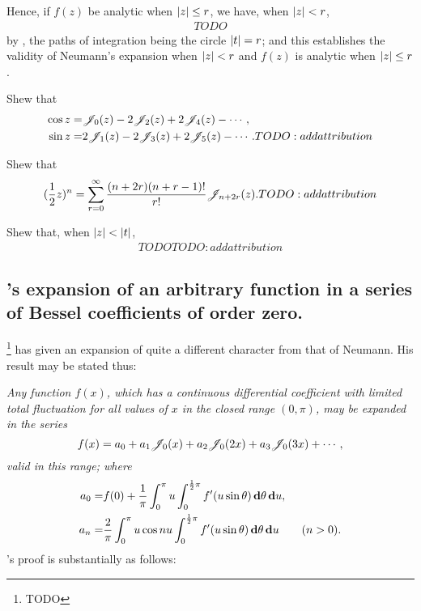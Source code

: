 \documentclass{book}
\begin{document}
Hence, if $f(z)$ be analytic when $\left| z \right| \leq r$, we have, when
$\left| z \right| < r$,
\begin{align*}
  TODO
\end{align*}
by , the paths of integration being the circle
$\left| t \right|=r$; and this establishes the validity of Neumann's
expansion when $\left| z \right| < r$ and $f(z)$ is analytic when
$\left| z \right|\leq r$.

% 
%
\begin{wandwexample}
  Shew that
  \begin{align*}
    \cos z =& \mathscr{J}_0(z) - 2\mathscr{J}_2(z) + 2\mathscr{J}_4(z) - \cdots, \\
    \sin z =& 2\mathscr{J}_1(z) - 2\mathscr{J}_3(z) + 2\mathscr{J}_5(z) - \cdots.
    TODO:addattribution
  \end{align*}
\end{wandwexample}
\begin{wandwexample}
  Shew that
  $$
  (\frac{1}{2} z)^n
  =
  \sum_{r=0}^{\infty}
  \frac{(n+2r)(n+r-1)!}{r!}
  \mathscr{J}_{n+2r}(z).
  TODO:addattribution
  $$
\end{wandwexample}
\begin{wandwexample}
  Shew that, when $\left| z \right|<\left| t \right|$,
  \begin{align*}
    TODO
    TODO:addattribution
  \end{align*}
\end{wandwexample}

\subsection{\Schlomilch's expansion of an arbitrary function in a
  series of Bessel coefficients of order zero.}
\Schlomilch\footnote{TODO} has given an expansion of quite a different
character from that of Neumann. His result may be stated thus:

\emph{
  Any function $f(x)$, which has a continuous differential coefficient
  with limited total fluctuation for all values of $x$ in the closed
  range $(0,\pi)$, may be expanded in the series
  $$
  f(x)
  =
  a_0 + a_1 \mathscr{J}_0(x) + a_2 \mathscr{J}_0(2x) + a_3 \mathscr{J}_0(3x) + \cdots,
  $$
  valid in this range; where
  \begin{align*}
    a_0 =& f(0)
    +
    \frac{1}{\pi}
    \int_{0}^{\pi} u
    \int_{0}^{\frac{1}{2}\pi} f'(u\sin\theta)
    \, \mathbf{d}\theta \, \mathbf{d} u,
    \\
    a_n =&
    \frac{2}{\pi}
    \int_{0}^{\pi} u\cos nu
    \int_{0}^{\frac{1}{2}\pi} f'(u\sin\theta)
    \, \mathbf{d}\theta \, \mathbf{d} u
    \qquad (n>0).
  \end{align*}
}
\Schlomilch's proof is substantially as follows:
\end{document}
